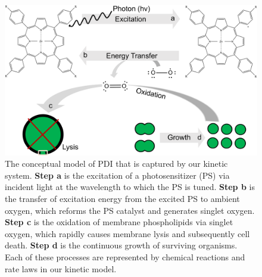 \begin{figure}
    \centering
    \includegraphics[width = \textwidth]{images/PDIpy/background/model.png}
    \caption{
        The conceptual model of PDI that is captured by our kinetic system. \textbf{Step a} is the  excitation of a photosensitizer (PS) via incident light at the wavelength to which the PS is tuned. \textbf{Step b} is the transfer of excitation energy from the excited PS to ambient oxygen, which reforms the PS catalyst and generates singlet oxygen. \textbf{Step c} is the oxidation of membrane phospholipids via singlet oxygen, which rapidly causes membrane lysis and subsequently cell death. \textbf{Step d} is the continuous growth of surviving organisms. Each of these processes are represented by chemical reactions and rate laws in our kinetic model.
    }
    \label{conceptual_model}
\end{figure}

